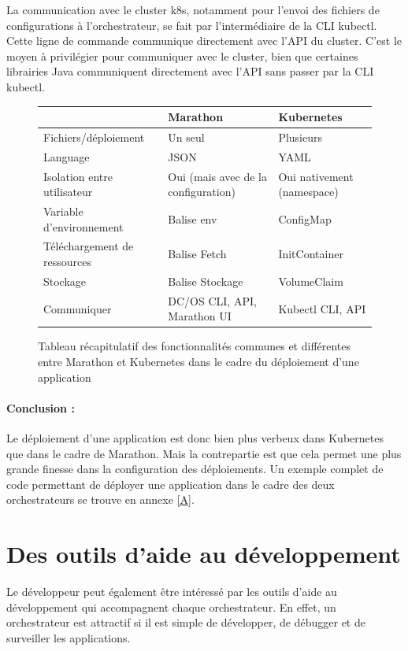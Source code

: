 \documentclass[11pt,fleqn]{book} %
\begin{document}
La communication avec le cluster k8s, notamment pour l'envoi des fichiers de configurations à l'orchestrateur, se fait par l'intermédiaire de la CLI kubectl. Cette ligne de commande communique directement avec l'API du cluster. C'est le moyen à privilégier pour communiquer avec le cluster, bien que certaines librairies Java communiquent directement avec l'API sans passer par la CLI kubectl.

\begin{figure}[H]\centering
\begin{tabular}{@{}lll@{}}
\toprule
                             & Marathon       & Kubernetes      \\ \midrule
Fichiers/déploiement         & Un seul         & Plusieurs       \\
Language                     & JSON           & YAML            \\
Isolation entre utilisateur & Oui (mais avec de la configuration)            & Oui nativement (namespace) \\
Variable d'environnement    & Balise env     & ConfigMap       \\
Téléchargement de ressources & Balise Fetch   & InitContainer   \\
Stockage                     & Balise Stockage & VolumeClaim     \\
Communiquer & DC/OS CLI, API, Marathon UI & Kubectl CLI, API\\
\bottomrule
\end{tabular}
\caption{Tableau récapitulatif des fonctionnalités communes et différentes entre Marathon et Kubernetes dans le cadre du déploiement d'une application}
\label{tab:my-table}
\end{figure}


\begin{interrupt}
\paragraph{Conclusion :}
Le déploiement d'une application est donc bien plus verbeux dans Kubernetes que dans le cadre de Marathon. Mais la contrepartie est que cela permet une plus grande finesse dans la configuration des déploiements. Un exemple complet de code permettant de déployer une application dans le cadre des deux orchestrateurs se trouve en annexe \ref{A}.
\end{interrupt}

\section{Des outils d'aide au développement}
Le développeur peut également être intéressé par les outils d'aide au développement qui accompagnent chaque orchestrateur. En effet, un orchestrateur est attractif si il est simple de développer, de débugger et de surveiller les applications.\\
\end{document}
